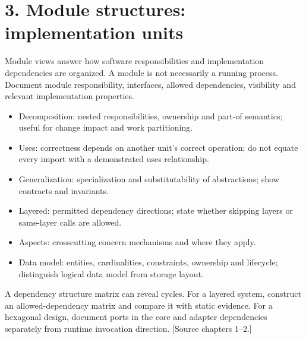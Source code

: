 \documentclass[11pt,letterpaper]{article}
\begin{document}
\section*{3. Module structures: implementation units}
Module views answer how software responsibilities and implementation dependencies are organized. A module is not necessarily a running process. Document module responsibility, interfaces, allowed dependencies, visibility and relevant implementation properties.\par\smallskip
\begin{itemize}
\item Decomposition: nested responsibilities, ownership and part-of semantics; useful for change impact and work partitioning.
\item Uses: correctness depends on another unit's correct operation; do not equate every import with a demonstrated uses relationship.
\item Generalization: specialization and substitutability of abstractions; show contracts and invariants.
\item Layered: permitted dependency directions; state whether skipping layers or same-layer calls are allowed.
\item Aspects: crosscutting concern mechanisms and where they apply.
\item Data model: entities, cardinalities, constraints, ownership and lifecycle; distinguish logical data model from storage layout.
\end{itemize}
A dependency structure matrix can reveal cycles. For a layered system, construct an allowed-dependency matrix and compare it with static evidence. For a hexagonal design, document ports in the core and adapter dependencies separately from runtime invocation direction. [Source chapters 1--2.]\par\smallskip
\end{document}
